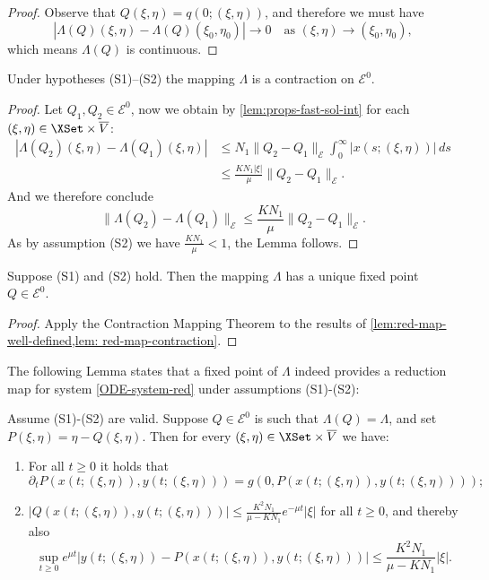 \documentclass[a4paper]{siamart190516}
\begin{document}
\begin{proof}
 Observe that $Q(\xi,\eta) = q(0;(\xi,\eta))$, and therefore we must have
 \[
 |\Lambda(Q)(\xi,\eta) - \Lambda(Q)(\xi_0,\eta_0)| \rightarrow 0 \quad \text{as } (\xi,\eta) \rightarrow (\xi_0,\eta_0),
 \]
 which means $\Lambda(Q)$ is continuous. 
\end{proof}

\begin{lemma}\label{lem: red-map-contraction}
  Under hypotheses (S1)--(S2) the mapping $\Lambda$ is a contraction on $\mathcal{E}^0$.
\end{lemma}

\begin{proof}
Let $Q_1, Q_2 \in \mathcal{E}^0$, now we obtain by \cref{lem:props-fast-sol-int} for each $(\xi,\eta) \in \XSet \times \overline{V}$:
\begin{align*}
|\Lambda(Q_2)(\xi,\eta) - \Lambda(Q_1)(\xi,\eta)| &\leq N_1 \| Q_2 - Q_1 \|_{\mathcal{E}} \int_0^{\infty} |x(s; (\xi,\eta))| \, ds \\
&\leq \frac{K N_1 |\xi|}{\mu}  \| Q_2 - Q_1 \|_{\mathcal{E}}.
\end{align*}
And we therefore conclude 
\[
\| \Lambda(Q_2) - \Lambda(Q_1) \|_{\mathcal{E}} \leq \frac{K N_1}{\mu}  \| Q_2 - Q_1 \|_{\mathcal{E}}.
\]
As by assumption (S2) we have $\frac{K N_1}{\mu} < 1$, the Lemma follows.
\end{proof}

\begin{corollary}\label{cor: red-map-contraction}
Suppose (S1) and (S2) hold. Then the mapping $\Lambda$ has a unique fixed point $Q \in \mathcal{E}^0$. 
\end{corollary}

\begin{proof}
Apply the Contraction Mapping Theorem to the results of
\cref{lem:red-map-well-defined,lem: red-map-contraction}.
\end{proof}

The following Lemma states that a fixed point of $\Lambda$ indeed provides a reduction map for system \cref{ODE-system-red} under assumptions (S1)-(S2):

\begin{lemma}\label{lem:red-map-props}
Assume (S1)-(S2) are valid. Suppose $Q \in  \mathcal{E}^0$ is such that $\Lambda(Q)=\Lambda$, and set $P(\xi,\eta) = \eta - Q(\xi,\eta)$. Then for every $(\xi,\eta) \in \XSet \times \overline{V}$ we have:
\begin{enumerate}
 \item For all $t \geq 0$ it holds that 
 \[
 \partial_t P(x(t; (\xi,\eta)),y(t;(\xi,\eta))) = g(0, P(x(t; (\xi,\eta)),y(t;(\xi,\eta))));
 \]
 \item $| Q(x(t; (\xi,\eta)),y(t;(\xi,\eta))) | \leq \frac{K^2 N_1}{\mu - K N_1} e^{-\mu t}  |\xi|$ for all $t \geq 0$, and thereby also
 \[
 \sup_{t \geq 0} e^{\mu t} | y(t;(\xi,\eta)) -  P(x(t; (\xi,\eta)),y(t;(\xi,\eta))) | \leq  \frac{K^2 N_1}{\mu - K N_1} |\xi|.
 \]
\end{enumerate}
\end{lemma}
\end{document}
